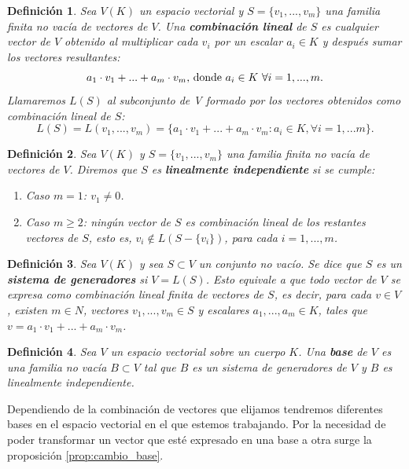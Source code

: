 \documentclass[a4paper,11pt, oneside]{book}
\newtheorem{defi}{Definición}
\begin{document}
\begin{defi}
	Sea $V(K)$ un espacio vectorial y $S = \{v_1,...,v_m\}$ una familia finita no vacía de vectores de $V$. Una \textbf{combinación lineal} de $S$ es cualquier vector de $V$ obtenido al multiplicar cada $v_i$ por un escalar $a_i \in K$ y después sumar los vectores resultantes:
	\begin{equation}
	a_1\cdot v_1+...+a_m\cdot v_m\textup{, donde } a_i \in K \textup{ }\forall i = 1,...,m.
	\end{equation}
	Llamaremos $L(S)$ al subconjunto de V formado por los vectores obtenidos como combinación lineal de $S$:
	\begin{equation}
	L(S) = L(v_1,...,v_m) = \{a_1\cdot v_1+...+a_m\cdot v_m : a_i \in K, \forall i = 1,...m\}.
	\end{equation}
\end{defi}



\begin{defi}
	Sea $V(K)$ y $S = \{v_1,...,v_m\}$ una familia finita no vacía de vectores de $V$. Diremos que $S$ es \textbf{linealmente independiente} si se cumple:
	\begin{enumerate}
		\item Caso $m=1$: $v_1 \neq 0$.
		\item Caso $m \geq 2$: ningún vector de $S$ es combinación lineal de los restantes vectores de $S$, esto es, $v_i \notin L(S -\{v_i\})$, para cada $i=1,...,m$.
	\end{enumerate}
\end{defi}
\begin{defi}
	Sea $V(K)$ y sea $S \subset V$ un conjunto no vacío. Se dice que $S$ es un \textbf{sistema de generadores} si $V = L(S)$. Esto equivale a que todo vector de $V$ se expresa como combinación lineal finita de vectores de $S$, es decir, para cada $v \in V$, existen $m \in N$, vectores $v_1,...,v_m \in S$ y escalares $a_1,...,a_m \in K$, tales que $v = a_1\cdot v_1+...+a_m\cdot v_m$.
\end{defi}
\begin{defi}
	Sea $V$ un espacio vectorial sobre un cuerpo $K$. Una \textbf{base} de $V$ es una familia no vacía $B \subset V$ tal que $B$ es un sistema de generadores de $V$ y $B$ es linealmente independiente.
\end{defi}

Dependiendo de la combinación de vectores que elijamos tendremos diferentes bases en el espacio vectorial en el que estemos trabajando. Por la necesidad de poder transformar un vector que esté expresado en una base a otra surge la proposición \ref{prop:cambio_base}.
\end{document}
